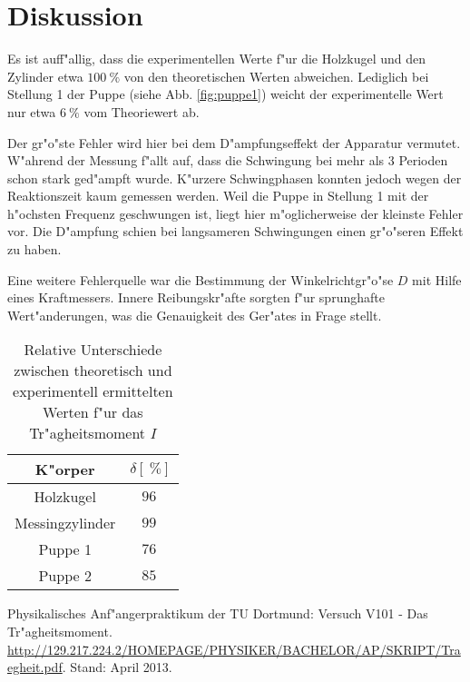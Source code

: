 \section{Diskussion}
\label{diskussion}
Es ist auff"allig, dass die experimentellen Werte f"ur die Holzkugel und den Zylinder etwa $\SI{100}{\percent}$ von den theoretischen Werten abweichen.
Lediglich bei Stellung 1 der Puppe (siehe Abb. \ref{fig:puppe1}) weicht der experimentelle Wert nur etwa $\SI{6}{\percent}$ vom Theoriewert ab.

Der gr"o"ste Fehler wird hier bei dem D"ampfungseffekt der Apparatur vermutet.
W"ahrend der Messung f"allt auf, dass die Schwingung bei mehr als 3 Perioden schon stark ged"ampft wurde.
K"urzere Schwingphasen konnten jedoch wegen der Reaktionszeit kaum gemessen werden.
Weil die Puppe in Stellung 1 mit der h"ochsten Frequenz geschwungen ist, liegt hier m"oglicherweise der kleinste Fehler vor.
Die D"ampfung schien bei langsameren Schwingungen einen gr"o"seren Effekt zu haben.

Eine weitere Fehlerquelle war die Bestimmung der Winkelrichtgr"o"se $D$ mit Hilfe eines Kraftmessers.
Innere Reibungskr"afte sorgten f"ur sprunghafte Wert"anderungen, was die Genauigkeit des Ger"ates in Frage stellt.

\begin{table}[h!]
	\begin{center}
		\caption{Relative Unterschiede zwischen theoretisch und experimentell ermittelten Werten f"ur das Tr"agheitsmoment $I$\label{tabelle:unterschiede}}
		\begin{tabular}{|c||c|}
			\hline
			K"orper & $\delta [\SI{}{\percent}]$ \\
			\hline 
			\hline
			Holzkugel & $\SI{96}{}$ \\
			Messingzylinder & $\SI{99}{}$ \\
			Puppe 1 & $\SI{76}{}$ \\
			Puppe 2 & $\SI{85}{}$ \\
			\hline 
		\end{tabular}
	\end{center}
\end{table}
	

\begin{thebibliography}{9}
	 Physikalisches Anf"angerpraktikum der TU Dortmund: Versuch V101 - Das Tr"agheitsmoment. \url{http://129.217.224.2/HOMEPAGE/PHYSIKER/BACHELOR/AP/SKRIPT/Traegheit.pdf}. Stand: April 2013.
\end{thebibliography}
